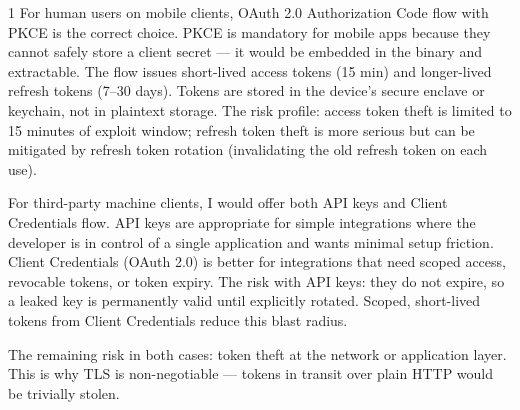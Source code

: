 \documentclass[11pt,a4paper]{article}
\begin{document}
\begin{answerbox}{1}
For human users on mobile clients, OAuth 2.0 Authorization Code flow with PKCE is the correct choice. PKCE is mandatory for mobile apps because they cannot safely store a client secret --- it would be embedded in the binary and extractable. The flow issues short-lived access tokens (15 min) and longer-lived refresh tokens (7--30 days). Tokens are stored in the device's secure enclave or keychain, not in plaintext storage. The risk profile: access token theft is limited to 15 minutes of exploit window; refresh token theft is more serious but can be mitigated by refresh token rotation (invalidating the old refresh token on each use).

For third-party machine clients, I would offer both API keys and Client Credentials flow. API keys are appropriate for simple integrations where the developer is in control of a single application and wants minimal setup friction. Client Credentials (OAuth 2.0) is better for integrations that need scoped access, revocable tokens, or token expiry. The risk with API keys: they do not expire, so a leaked key is permanently valid until explicitly rotated. Scoped, short-lived tokens from Client Credentials reduce this blast radius.

The remaining risk in both cases: token theft at the network or application layer. This is why TLS is non-negotiable --- tokens in transit over plain HTTP would be trivially stolen.
\end{answerbox}

\vspace{0.4cm}
\end{document}
